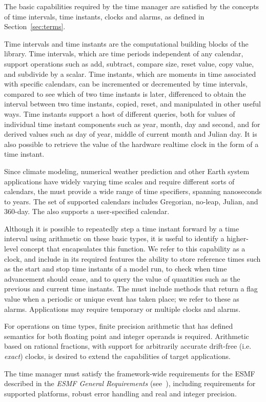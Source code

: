 
The basic capabilities required by the time manager are satisfied by
the concepts of time intervals, time instants, clocks and alarms, as defined 
in Section~\ref{sec:terms}.  

Time intervals and time instants are the computational building blocks of the \funcname 
library.  Time intervals, which are time periods independent of any calendar, support 
operations such as add, subtract, compare size, reset value, copy value, and 
subdivide by a scalar.  Time instants, which are moments in time associated 
with specific calendars, can be incremented or decremented by time intervals, compared 
to see which of two time instants is later, differenced to obtain the interval
between two time instants, copied, reset, and manipulated in other useful ways.
Time instants support a host of different queries, both for values of individual time instant 
components such as year, month, day and second, and for derived values such 
as day of year, middle of current month and Julian day.  It is also possible 
to retrieve the value of the hardware realtime clock in the form of a time instant.

Since climate modeling, numerical weather prediction and other 
Earth system applications have widely varying time scales and require different sorts
of calendars, the \funcname must provide a wide range of time specifiers, spanning 
nanoseconds to years.  The set of supported calendars includes Gregorian, no-leap,
Julian, and 360-day.  The \funcname also supports a user-specified calendar.

Although it is possible to repeatedly step a time instant forward by a time interval using 
arithmetic on these basic types, it is useful to identify a higher-level concept 
that encapsulates this function.  We refer to this capability as a clock, and include 
in its required features the ability to store reference times such as the start and
stop time instants of a model run, to check when time advancement should cease, and to query 
the value of quantities such as the previous and current time instants.  The \funcname 
must include methods that return a flag value when a periodic or unique event has taken 
place; we refer to these as alarms.  Applications may require temporary 
or multiple clocks and alarms.  

For operations on time types, finite precision arithmetic that has defined semantics 
for both floating point and integer operands is required. Arithmetic based on rational 
fractions, with support for arbitrarily accurate drift-free 
(i.e. {\it exact}) clocks, is desired to extend the capabilities of target
applications.

The time manager must satisfy the framework-wide requirements for the ESMF described 
in the {\it ESMF General Requirements} (see~\cite{ESMFGenReq}), including requirements for 
supported platforms, robust error handling and real and integer precision.

















